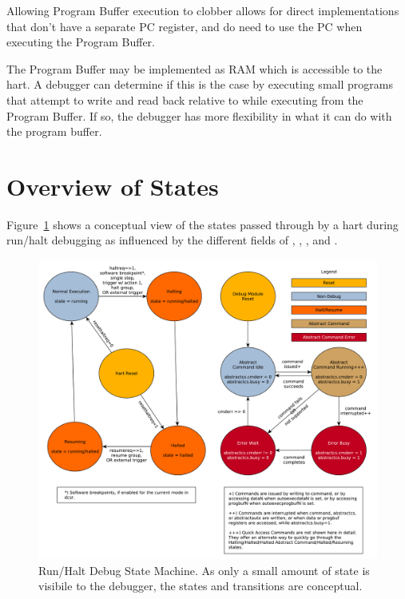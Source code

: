 \begin{commentary}
    Allowing Program Buffer execution to clobber \Rdpc allows for direct
    implementations that don't have a separate PC register, and do need to use
    the PC when executing the Program Buffer.
\end{commentary}

The Program Buffer may be implemented as RAM which is accessible to the
hart. A debugger can determine if this is the case by executing small
programs that attempt to write and read back relative to \Rpc while executing
from the Program Buffer.
If so, the debugger has more flexibility in what it can do with the program buffer.

\section{Overview of States}

Figure~\ref{fig:abstract_sm} shows a conceptual view of the states
passed through by a hart during run/halt debugging as influenced
by the different fields of \Rdmcontrol, \Rabstractcs, \Rabstractauto, and
\Rcommand.

\begin{figure}
   \centering
   \includegraphics[width=\textwidth]{fig/abstract_commands.pdf}
   \caption[Run/Halt Debug State Machine]{Run/Halt Debug State Machine.
     As only a small amount of state is visibile to the debugger,
     the states and transitions are conceptual.}
   \label{fig:abstract_sm}
\end{figure}

